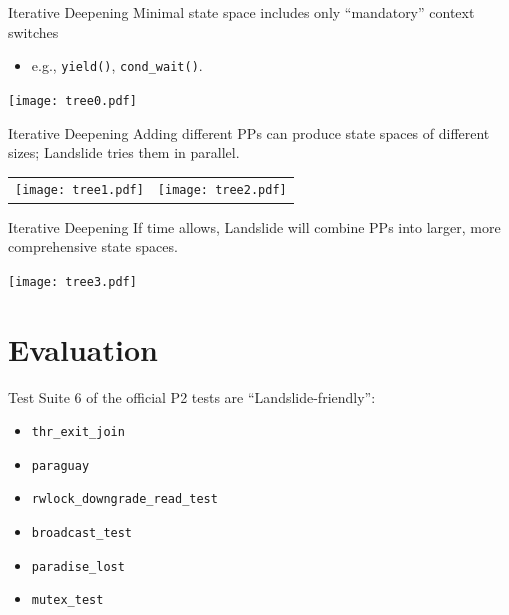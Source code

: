 \documentclass[xcolor=dvipsnames]{beamer}
\begin{document}
\begin{frame}{Iterative Deepening}
	Minimal state space includes only ``mandatory'' context switches
	\begin{itemize}
		\item e.g., {\tt yield()}, {\tt cond\_wait()}.
	\end{itemize}
	\vspace{0.29in}
	\begin{center}
		\texttt{[image: tree0.pdf]}
	\end{center}
\end{frame}

\begin{frame}{Iterative Deepening}
	Adding different PPs can produce state spaces of different sizes; Landslide tries them in parallel.
	\vspace{0.15in}
	\begin{center}
		\begin{tabular}{cc}
			\texttt{[image: tree1.pdf]} &
			\texttt{[image: tree2.pdf]}
		\end{tabular}
	\end{center}
\end{frame}


\begin{frame}{Iterative Deepening}
	If time allows, Landslide will combine PPs into larger, more comprehensive state spaces.
	\begin{center}
		\texttt{[image: tree3.pdf]}
	\end{center}
\end{frame}


\section{Evaluation}


\begin{frame}{Test Suite}
	6 of the official P2 tests are ``Landslide-friendly'':
	\begin{itemize}
		\item {\tt thr\_exit\_join}
		\item {\tt paraguay}
		\item {\tt rwlock\_downgrade\_read\_test}
		\item {\tt broadcast\_test}
		\item {\tt paradise\_lost} %
		\item {\tt mutex\_test} %
	\end{itemize}
\end{frame}
\end{document}
